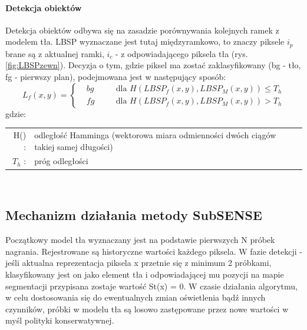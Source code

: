 \paragraph{Detekcja obiektów \\}
Detekcja obiektów odbywa się na zasadzie porównywania kolejnych ramek z modelem tła. LBSP wyznaczane jest tutaj międzyramkowo, to znaczy piksele $i_{p}$ brane są z aktualnej ramki, $i_{c}$ - z odpowiadającego piksela tła (rys. \ref{fig:LBSPzewn}). Decyzja o tym, gdzie piksel ma zostać zaklasyfikowany (bg - tło, fg - pierwszy plan), podejmowana jest w następujący sposób:
\begin{equation}
L_{f}(x,y)=\left\{
\begin{split}
&bg & \quad &\text{dla $H(LBSP_{f}(x,y),LBSP_{M}(x,y))\leq T_{h}$} \\
&fg & \quad &\text{dla $H(LBSP_{f}(x,y),LBSP_{M}(x,y))>T_{h}$}
\end{split}
\right.
\end{equation}
gdzie:\\ 
\hspace*{3em}
\begin{tabular}{r l}
H() : &  odległość Hamminga (wektorowa miara odmienności dwóch ciągów takiej samej długości)\\
$T_{h}$ : & próg odległości\\
\end{tabular} \\

\subsection{Mechanizm działania metody SubSENSE}
Początkowy model tła wyznaczany jest na podstawie pierwszych N próbek nagrania. Rejestrowane są historyczne wartości każdego piksela. W fazie detekcji - jeśli aktualna reprezentacja piksela x przetnie się z minimum 2 próbkami, klasyfikowany jest on jako element tła i odpowiadającej mu pozycji na mapie segmentacji przypisana zostaje wartość St(x) = 0. W czasie działania algorytmu, w celu dostosowania się do ewentualnych zmian oświetlenia bądź innych czynników, próbki w modelu tła są losowo zastępowane przez nowe wartości w myśl polityki konserwatywnej.
